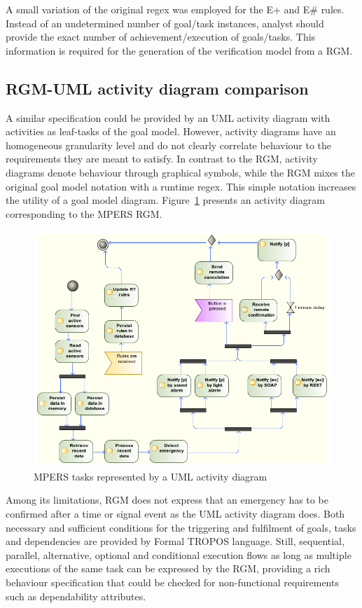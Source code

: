 A small variation of the original regex was employed for the E+ and E\# rules. Instead of an undetermined number of goal/task instances, analyst should provide the exact number of achievement/execution of goals/tasks. This information is required for the generation of the verification model from a RGM.

\subsection{RGM-UML activity diagram comparison}

A similar specification could be provided by an UML activity diagram with activities as leaf-tasks of the goal model. However, activity diagrams have an homogeneous granularity level and do not clearly correlate behaviour to the requirements they are meant to satisfy. In contrast to the RGM, activity diagrams denote behaviour through graphical symbols, while the RGM mixes the original goal model notation with a runtime regex. This simple notation increases the utility of a goal model diagram. Figure~\ref{fig:MPERS_UMLAD} presents an activity diagram corresponding to the MPERS RGM. 

\begin{figure}[h!]
\centering
\includegraphics[width=1\textwidth]{imgs/MPERS_UMLAD.png}
\caption{MPERS tasks represented by a UML activity diagram}
\label{fig:MPERS_UMLAD}
\end{figure}

Among its limitations, RGM does not express that an emergency has to be confirmed after a time or signal event as the UML activity diagram does. Both necessary and sufficient conditions for the triggering and fulfilment of goals, tasks and dependencies are provided by Formal TROPOS language.  Still, sequential, parallel, alternative, optional and conditional execution flows as long as multiple executions of the same task can be expressed by the RGM, providing a rich behaviour specification that could be checked for non-functional requirements such as dependability attributes.

